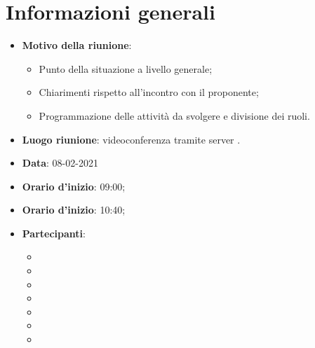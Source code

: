 \section{Informazioni generali}
\begin{itemize}
\item \textbf{Motivo della riunione}: 
\begin{itemize}
\item Punto della situazione a livello generale;
\item Chiarimenti rispetto all'incontro con il proponente;
\item Programmazione delle attività da svolgere e divisione dei ruoli.
\end{itemize}
\item \textbf{Luogo riunione}: videoconferenza tramite server .
\item \textbf{Data}: 08-02-2021
\item \textbf{Orario d'inizio}: 09:00;
\item \textbf{Orario d'inizio}: 10:40;
\item \textbf{Partecipanti}:
	\begin{itemize}
	\item \BM{}
	\item \SG{}
	\item \SP{}
	\item \SH{}
	\item \PA{}
	\item \ZM{}
	\item \RA{}
	\end{itemize}
\end{itemize}

\newpage
